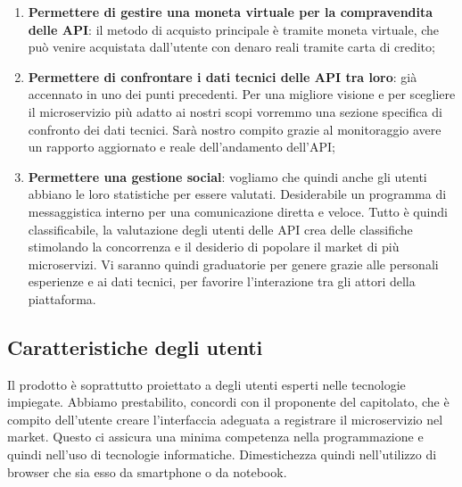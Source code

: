 \documentclass[12pt,a4paper,titlepage]{article}
\begin{document}
\begin{enumerate}
		\item \textbf{Permettere di gestire una moneta virtuale per la compravendita delle API}: il metodo di acquisto principale è tramite moneta virtuale, che può venire acquistata dall'utente con denaro reali tramite carta di credito;
		\item \textbf{Permettere di confrontare i dati tecnici delle API tra loro}: già accennato in uno dei punti precedenti. Per una migliore visione e per scegliere il microservizio più adatto ai nostri scopi vorremmo una sezione specifica di confronto dei dati tecnici. Sarà nostro compito grazie al monitoraggio avere un rapporto aggiornato e reale dell'andamento dell'API;
		\item \textbf{Permettere una gestione social}: vogliamo che quindi anche gli utenti abbiano le loro statistiche per essere valutati. Desiderabile un programma di messaggistica interno per una comunicazione diretta e veloce. Tutto è quindi classificabile, la valutazione degli utenti delle API crea delle classifiche stimolando la concorrenza e il desiderio di popolare il market di più microservizi. Vi saranno quindi graduatorie per genere grazie alle personali esperienze e ai dati tecnici, per favorire l'interazione tra gli attori della piattaforma.
	\end{enumerate}
	
	\subsection{Caratteristiche degli utenti}
	Il prodotto è soprattutto proiettato a degli utenti esperti nelle tecnologie impiegate. Abbiamo prestabilito, concordi con il proponente del capitolato, che è compito dell'utente creare l'interfaccia adeguata a registrare il microservizio nel market. Questo ci assicura una minima competenza nella programmazione e quindi nell'uso di tecnologie informatiche. Dimestichezza quindi nell'utilizzo di browser che sia esso da smartphone o da notebook. 
	
\end{document}
